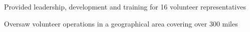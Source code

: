 \documentclass[letterpaper]{deedy-resume} %
\begin{document}
\begin{minipage}[t]{0.33\textwidth}

\vspace{\topsep} %
\begin{tightitemize}
\item Provided leadership, development and training for 16 volunteer representatives
\item Oversaw volunteer operations in a geographical area covering over 300 miles
\end{tightitemize}

\sectionspace %




\end{minipage} %
\end{document}
